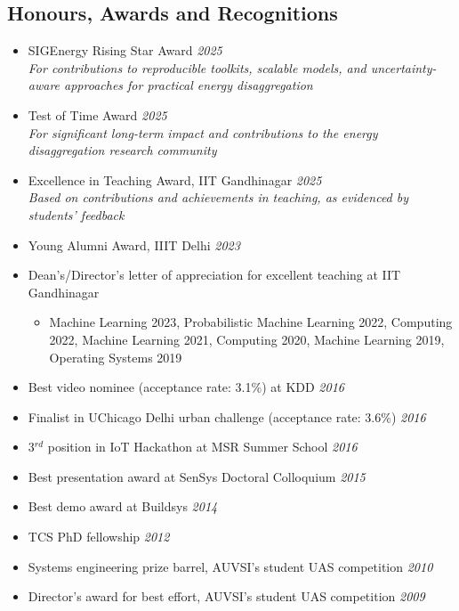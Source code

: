 \documentclass[letter,10pt]{article}
\begin{document}
\subsection*{\textbf{Honours, Awards and Recognitions}}
\vspace{-0.4em}
\begin{itemize}
\item[]{SIGEnergy Rising Star Award} \hfill\textit{2025}\\
    \textit{For contributions to reproducible toolkits, scalable models, and uncertainty-aware approaches for practical energy disaggregation}
    
\item[]{Test of Time Award} \hfill\textit{2025}\\
    \textit{For significant long-term impact and contributions to the energy disaggregation research community}
    
\item[]{Excellence in Teaching Award, IIT Gandhinagar} \hfill\textit{2025}\\
    \textit{Based on contributions and achievements in teaching, as evidenced by students' feedback}

\item[]{Young Alumni Award, IIIT Delhi} \hfill\textit{2023}

    \item[] Dean's/Director's letter of appreciation for excellent teaching at IIT Gandhinagar
    \begin{itemize}
        \item[] Machine Learning 2023, Probabilistic Machine Learning 2022, Computing 2022, Machine Learning 2021, Computing 2020, Machine Learning 2019, Operating Systems 2019
    \end{itemize}
    \item[]{Best video nominee (acceptance rate: 3.1\%)} at KDD \hfill\textit{2016}
    \item[]{Finalist in UChicago Delhi urban challenge (acceptance rate: 3.6\%)} \hfill\textit{2016}
    \item[]{3$^{rd}$ position in IoT Hackathon at MSR Summer School} \hfill\textit{2016}
    
    \item[]{Best presentation award at SenSys Doctoral Colloquium} \hfill\textit{2015}
    \item[]{Best demo award at Buildsys} \hfill\textit{2014}
    \item[]{TCS PhD fellowship} \hfill\textit{2012}
    \item[]{Systems engineering prize barrel, AUVSI's student UAS competition} \hfill\textit{2010}
    \item[]{Director's award for best effort, AUVSI's student UAS competition} \hfill\textit{2009}


\end{itemize}
\end{document}
